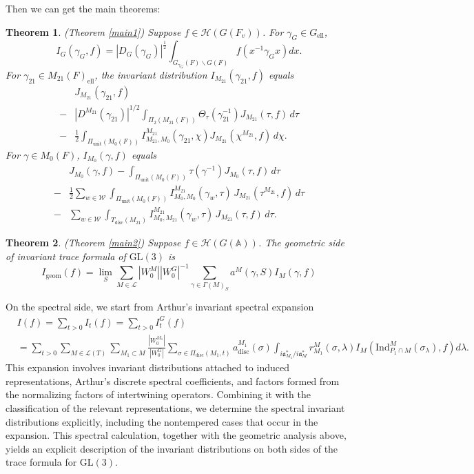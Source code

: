\documentclass[11pt]{amsart}
\newtheorem {theorem}    {Theorem}[section]
\renewcommand{\rm}{\mathrm}
\newcommand{\GGL}{\mathrm{GL}}
\theoremstyle{definition}
\numberwithin{equation}{section}
\begin{document}
     Then we can get the main theorems:
     \begin{theorem}(Theorem \ref{main1})
		Suppose \(f\in\mathcal{H}(G(F_v))\). For \(\gamma_G\in G_{\rm{ell}}\), \[I_G(\gamma_G,f)=|D_G(\gamma_G)|^{\frac{1}{2}}\int_{G_{\gamma_G}(F)\backslash G(F)}f(x^{-1}\gamma_G x)dx.\] 
		For \(\gamma_{21}\in M_{21}(F)_{\rm{ell}}\), the invariant distribution \(I_{M_{21}}(\gamma_{21},f)\) equals 
        \begin{align*}
            &J_{M_{21}}(\gamma_{21},f)\\
-&
|D^{M_{21}}(\gamma_{21})|^{1/2}
\int_{\Pi_2(M_{21}(F))}
\Theta_\tau(\gamma_{21}^{-1})
J_{M_{21}}(\tau,f)\,d\tau\\
-&
\frac12
\int_{\Pi_{\mathrm{unit}}(M_0(F))}
I_{M_{21},M_0}^{M_{21}}(\gamma_{21},\chi)
J_{M_{21}}(\chi^{M_{21}},f)\,d\chi.
        \end{align*}
		For \(\gamma\in M_0(F)\),
		\(I_{M_0}(\gamma,f)\) equals 
		\begin{align*}
			&J_{M_0}(\gamma,f)-
\int_{\Pi_{\mathrm{unit}}(M_0(F))}
\tau(\gamma^{-1})J_{M_0}(\tau,f)\,d\tau\\
-&
\frac12\sum_{w\in\mathscr W}
\int_{\Pi_{\mathrm{unit}}(M_0(F))}
I_{M_0,M_0}^{M_{21}}(\gamma_w,\tau)\,
J_{M_{21}}(\tau^{M_{21}},f)\,d\tau\\
-&
\sum_{w\in\mathscr W}
\int_{T_{\mathrm{disc}}(M_{21})}
I_{M_0,M_{21}}^{M_{21}}(\gamma_w,\tau)\,
J_{M_{21}}(\tau,f)\,d\tau.
		\end{align*}
	\end{theorem}
    \begin{theorem}(Theorem \ref{main2})
		Suppose \(f\in\mathcal{H}(G(\mathbb{A}))\). The geometric side of invariant trace formula of \(\GGL(3)\) is 
		\[
		I_{\rm{geom}}(f) = \lim_{S} \sum_{M \in \mathcal{L}} |W_0^M| |W_0^G|^{-1} \sum_{\gamma \in \Gamma(M)_S} a^M(\gamma,S) I_M(\gamma, f)
		\]
	\end{theorem}
     On the spectral side, we start from Arthur’s invariant spectral expansion
	\begin{align*}
		&I(f)=\sum_{t>0}I_t(f) = \sum_{t>0}I_t^G(f) \\
        &=\sum_{t>0}\sum_{M \in \mathcal{L}(T)} \sum_{M_1 \subset M}\frac{|W_0^{M_1}|}{|W_0^G|} \sum_{\sigma \in \Pi_{\mathrm{disc}}(M_1, t)} a_{\mathrm{disc}}^{M_1}(\sigma)\int_{i\mathfrak{a}_{M_1}^* / i\mathfrak{a}_M^*} r_{M_1}^M(\sigma, \lambda) I_M \left( \mathrm{Ind}_{P_1\cap M}^M(\sigma_\lambda), f \right) d\lambda.
	\end{align*}
	This expansion involves invariant distributions attached to induced representations, Arthur’s discrete spectral coefficients, and factors formed from the normalizing factors of intertwining operators. Combining it with the classification of the relevant representations, we determine the spectral invariant distributions explicitly, including the nontempered cases that occur in the expansion. This spectral calculation, together with the geometric analysis above, yields an explicit description of the invariant distributions on both sides of the trace formula for \(\mathrm{GL}(3)\).
    
\end{document}
